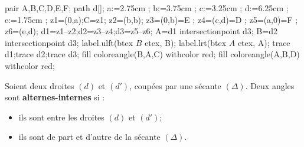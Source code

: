 \begin{changemargin}{0mm}{-25mm}
   \begin{definition}
      \begin{minipage}{0.3\linewidth}
         \begin{center}
            \begin{Geometrie}[CoinHD={(4u,7u)}]
               pair A,B,C,D,E,F;
               path d[];
               a:=2.75cm ;
               b:=3.75cm ;
               c:=3.25cm ;
               d:=6.25cm ;
               e:=1.75cm ;
               z1=(0,a);C=z1;
               z2=(b,b);
               z3=(0,b)=E ;
               z4=(c,d)=D ;
               z5=(a,0)=F ;
               z6=(e,d);
               d1=z1--z2;d2=z3--z4;d3=z5--z6;
               A=d1 intersectionpoint d3;
               B=d2 intersectionpoint d3;
               label.ulft(btex $B$ etex, B);
               label.lrt(btex $A$ etex, A);
               trace d1;trace d2;trace d3;
               fill coloreangle(B,A,C) withcolor red;
               fill coloreangle(A,B,D) withcolor red;
            \end{Geometrie}
         \end{center}
      \end{minipage}
      \hfill
      \begin{minipage}{0.6\linewidth}
         Soient deux droites $(d)$ et $(d')$, coupées par une sécante $(\Delta)$.
         Deux angles sont \textbf{\red alternes-internes} si :
         \begin{itemize}
            \item  ils sont entre les droites $(d)$ et $(d')$;
            \item  ils sont de part et d'autre de la sécante $(\Delta)$.
         \end{itemize}
      \end{minipage}
   \end{definition}


\end{changemargin}
